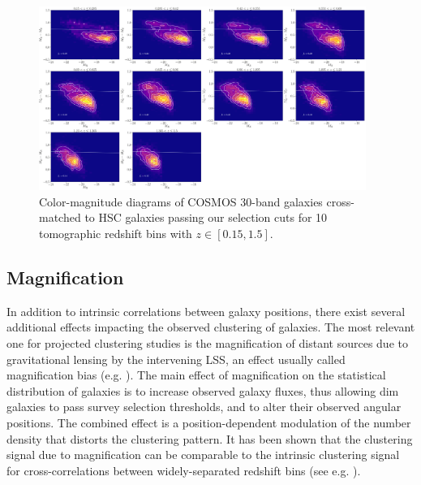 \documentclass[a4paper,11pt]{article}
\begin{document}

      \begin{figure}
        \begin{center}
          \includegraphics[width=0.95\textwidth]{figures/color-magnitude_cut=COSMOS30_nbin=10_weights=True.pdf}
          \caption{Color-magnitude diagrams of COSMOS 30-band galaxies cross-matched to HSC galaxies passing our selection cuts for 10 tomographic redshift bins with $z \in [0.15, 1.5]$.}
          \label{fig:color-mag}
        \end{center}
      \end{figure}
      
  \subsection{Magnification}\label{ssec:results.magnification}
    In addition to intrinsic correlations between galaxy positions, there exist several additional effects impacting the observed clustering of galaxies. The most relevant one for projected clustering studies is the magnification of distant sources due to gravitational lensing by the intervening LSS, an effect usually called magnification bias (e.g. \cite{Schneider:1989, Narayan:1989}). The main effect of magnification on the statistical distribution of galaxies is to increase observed galaxy fluxes, thus allowing dim galaxies to pass survey selection thresholds, and to alter their observed angular positions. The combined effect is a position-dependent modulation of the number density that distorts the clustering pattern. It has been shown that the clustering signal due to magnification can be comparable to the intrinsic clustering signal for cross-correlations between widely-separated redshift bins (see e.g. \cite{Challinor:2011}).
\end{document}
